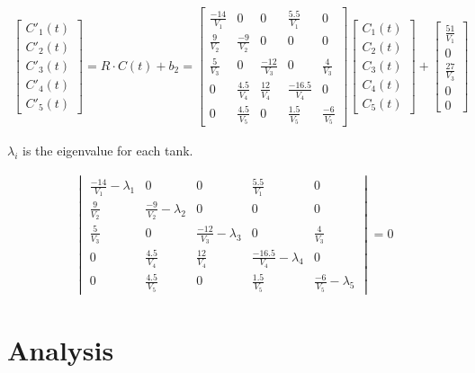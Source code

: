 \documentclass[a4paper, 12pt]{article}
\begin{document}
\begin{align}
	\begin{bmatrix}
		C'_1(t)\\C'_2(t)\\C'_3(t)\\C'_4(t)\\C'_5(t)
	\end{bmatrix} = R\cdot C(t)+ b_2 = 
	\begin{bmatrix}
		\frac{-14}{V_1} & 0 & 0 & \frac{5.5}{V_1} & 0\\
		\frac{9}{V_2} & \frac{-9}{V_2} & 0 & 0 & 0\\
		\frac{5}{V_3} & 0 & \frac{-12}{V_3} & 0 & \frac{4}{V_3}\\
		0 & \frac{4.5}{V_4} & \frac{12}{V_4} & \frac{-16.5}{V_4} & 0 \\
		0 & \frac{4.5}{V_5} & 0 & \frac{1.5}{V_5} & \frac{-6}{V_5}
	\end{bmatrix}
	\begin{bmatrix}
		C_1(t)\\C_2(t)\\C_3(t)\\C_4(t)\\C_5(t)
	\end{bmatrix} +
	\begin{bmatrix}
		\frac{51}{V_1}\\0\\\frac{27}{V_3}\\0\\0
	\end{bmatrix}
\end{align}

$\lambda_i$ is the eigenvalue for each tank.

\begin{align}
	\begin{vmatrix}
		\frac{-14}{V_1}-\lambda_1 & 0 & 0 & \frac{5.5}{V_1} & 0\\
		\frac{9}{V_2} & \frac{-9}{V_2}-\lambda_2 & 0 & 0 & 0\\
		\frac{5}{V_3} & 0 & \frac{-12}{V_3}-\lambda_3 & 0 & \frac{4}{V_3}\\
		0 & \frac{4.5}{V_4} & \frac{12}{V_4} & \frac{-16.5}{V_4}-\lambda_4 & 0 \\
		0 & \frac{4.5}{V_5} & 0 & \frac{1.5}{V_5} & \frac{-6}{V_5}-\lambda_5
	\end{vmatrix} = 0
\end{align}
\section{Analysis}
\end{document}
